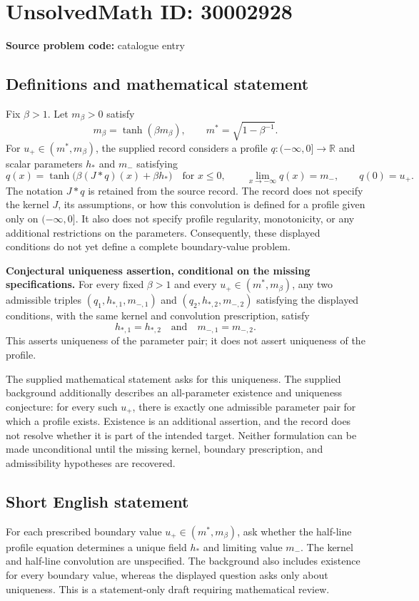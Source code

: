 \documentclass[11pt]{article}
\newcommand{\R}{\mathbb{R}}
\begin{document}
\section*{UnsolvedMath ID: 30002928}
\textbf{Source problem code:} catalogue entry
\subsection{Definitions and mathematical statement}
Fix \(\beta>1\). Let \(m_\beta>0\) satisfy
\[
m_\beta=\tanh(\beta m_\beta),
\qquad m^*=\sqrt{1-\beta^{-1}}.
\]
For \(u_+\in(m^*,m_\beta)\), the supplied record considers a profile \(q:(-\infty,0]\to\R\) and scalar parameters \(h_*\) and \(m_-\) satisfying
\[
q(x)=\tanh\!\bigl(\beta(J*q)(x)+\beta h_*\bigr)
\quad\text{for }x\leq0,
\qquad
\lim_{x\to-\infty}q(x)=m_-,
\qquad q(0)=u_+.
\]
The notation \(J*q\) is retained from the source record. The record does not specify the kernel \(J\), its assumptions, or how this convolution is defined for a profile given only on \(( -\infty,0]\). It also does not specify profile regularity, monotonicity, or any additional restrictions on the parameters. Consequently, these displayed conditions do not yet define a complete boundary-value problem.

\textbf{Conjectural uniqueness assertion, conditional on the missing specifications.} For every fixed \(\beta>1\) and every \(u_+\in(m^*,m_\beta)\), any two admissible triples \((q_1,h_{*,1},m_{-,1})\) and \((q_2,h_{*,2},m_{-,2})\) satisfying the displayed conditions, with the same kernel and convolution prescription, satisfy
\[
h_{*,1}=h_{*,2}
\quad\text{and}\quad
m_{-,1}=m_{-,2}.
\]
This asserts uniqueness of the parameter pair; it does not assert uniqueness of the profile.

The supplied mathematical statement asks for this uniqueness. The supplied background additionally describes an all-parameter existence and uniqueness conjecture: for every such \(u_+\), there is exactly one admissible parameter pair for which a profile exists. Existence is an additional assertion, and the record does not resolve whether it is part of the intended target. Neither formulation can be made unconditional until the missing kernel, boundary prescription, and admissibility hypotheses are recovered.
\subsection{Short English statement}
For each prescribed boundary value \(u_+\in(m^*,m_\beta)\), ask whether the half-line profile equation determines a unique field \(h_*\) and limiting value \(m_-\). The kernel and half-line convolution are unspecified. The background also includes existence for every boundary value, whereas the displayed question asks only about uniqueness. This is a statement-only draft requiring mathematical review.
\end{document}
